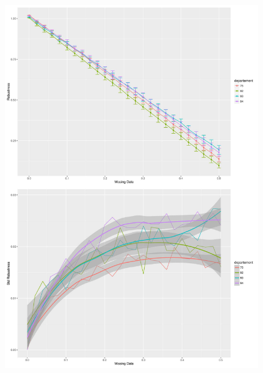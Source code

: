 \begin{figure}
\includegraphics[width=0.9\linewidth]{Figures/Final/B-robustness-sensitivity.jpg}

\end{figure}
